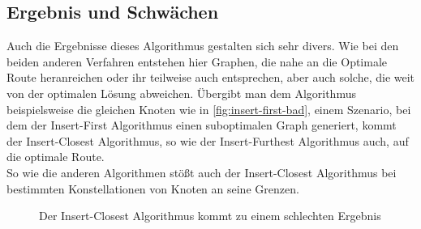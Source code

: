 \subsection{Ergebnis und Schwächen}
Auch die Ergebnisse dieses Algorithmus gestalten sich sehr divers.
Wie bei den beiden anderen Verfahren entstehen hier Graphen, die nahe an die Optimale Route heranreichen oder ihr teilweise auch entsprechen, aber auch solche, die weit von der optimalen Lösung abweichen.
Übergibt man dem Algorithmus beispielsweise die gleichen Knoten wie in \vref{fig:insert-first-bad}, einem Szenario, bei dem der Insert-First Algorithmus einen suboptimalen Graph generiert, kommt der Insert-Closest Algorithmus, so wie der Insert-Furthest Algorithmus auch, auf die optimale Route.\\
So wie die anderen Algorithmen stößt auch der Insert-Closest Algorithmus bei bestimmten Konstellationen von Knoten an seine Grenzen.

\begin{figure}
    \begin{center}
        \hfil
        \caption{Der Insert-Closest Algorithmus kommt zu einem schlechten Ergebnis}
        \label{fig:insert-closest-BAD}
    \end{center}
\end{figure}

